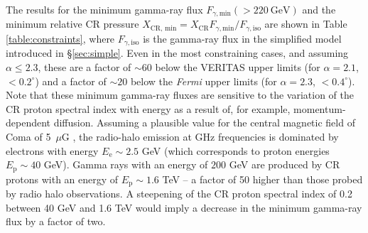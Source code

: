 \documentclass[12pt,manuscript]{aastex}
\def\C#1{#1}
\def\Fermi{{\em Fermi}\xspace}
\newcommand{\rmn}{\mathrm}
\newcommand{\CR}{\mathrm{CR}}
\begin{document}
The results for the minimum gamma-ray flux $F_{\gamma,\rmn{min}}(>220~\rmn{GeV})$ and the minimum
relative CR pressure $X_{\CR,\,\rmn{min}} = X_\CR F_{\gamma,\rmn{min}}/F_{\gamma,\rmn{iso}}$ are
shown in Table \ref{table:constraints}, where $F_{\gamma,\rmn{iso}}$ is the gamma-ray flux in the
simplified model introduced in \S\ref{sec:simple}. \C{Even in the most constraining cases, and
assuming $\alpha\leq 2.3$, these are a factor of $\sim 60$ below the VERITAS upper limits (for
$\alpha=2.1$, $<0.2^{\circ}$) and a factor of $\sim 20$ below the \Fermi upper limits (for
$\alpha=2.3$, $<0.4^{\circ}$)}. Note that these minimum gamma-ray fluxes are sensitive to the
variation of the CR proton spectral index with energy as a result of, for example,
momentum-dependent diffusion. Assuming a plausible value for the central magnetic field of Coma of
5~$\mu$G \citep{article:Bonafede_etal:2010}, the radio-halo emission at GHz frequencies is
dominated by electrons with energy $E_\rmn{e} \sim 2.5$ GeV (which corresponds to proton energies
$E_\rmn{p} \sim 40$ GeV). Gamma rays with an energy of $200$ GeV are produced by CR protons with an
energy of $E_\rmn{p} \sim 1.6$ TeV -- a factor of 50 higher than those probed by radio halo
observations. A steepening of the CR proton spectral index of 0.2 between 40 GeV and 1.6 TeV would
imply a decrease in the minimum gamma-ray flux by a factor of two.

%
%
 
\end{document}
